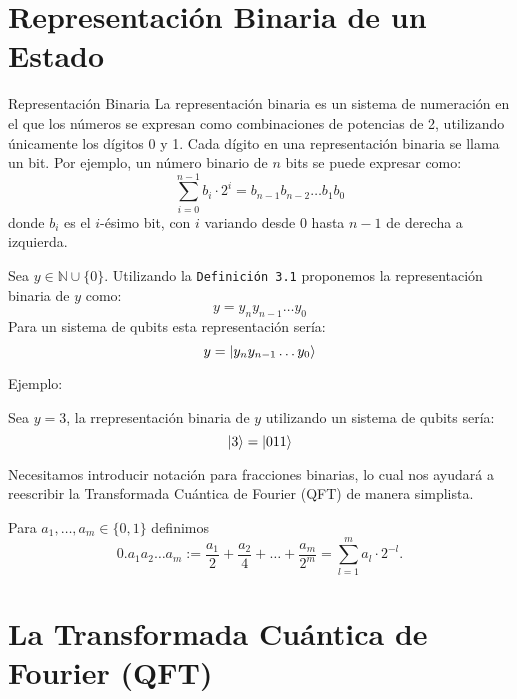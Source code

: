 \documentclass{article}
\begin{document}
\section{Representación Binaria de un Estado}
\begin{mydef}{Representación Binaria}{}
La representación binaria es un sistema de numeración en el que los números se expresan como combinaciones de potencias de 2, utilizando únicamente los dígitos 0 y 1. Cada dígito en una representación binaria se llama un bit. Por ejemplo, un número binario de \( n \) bits se puede expresar como:
\[
 \sum_{i=0}^{n-1} b_i \cdot 2^i = b_{n-1}b_{n-2}\ldots b_1b_0 
\]
donde \( b_i \) es el \( i \)-ésimo bit, con \( i \) variando desde 0 hasta \( n-1 \) de derecha a izquierda.
\end{mydef}
Sea \(y\in \mathbb{N}\cup\{0\}\). Utilizando la \texttt{Definición 3.1} proponemos la representación binaria
de \(y\) como: 
\[y= y_{n}y_{n-1}\ldots y_{0}\]
Para un sistema de qubits esta representación sería:
\[y= \ket{y_{n}y_{n-1}\ldots y_{0}}\]
\begin{mdframed}[linewidth=1pt, linecolor=orange]
    Ejemplo:

    Sea \(y= 3\), la rrepresentación binaria de \(y\) utilizando un sistema de qubits sería:
    \[\ket{3} = \ket{011}\]
\end{mdframed}

Necesitamos introducir notación para fracciones binarias,
lo cual nos ayudará a reescribir la Transformada Cuántica de Fourier (QFT)
de manera simplista.
\begin{mydef}{}{}
    Para $a_1, \ldots, a_m \in \{0, 1\}$ definimos
\[
0.a_1a_2 \ldots a_m := \frac{a_1}{2} + \frac{a_2}{4} + \ldots + \frac{a_m}{2^m} =
\sum_{l=1}^{m} a_l \cdot 2^{-l}.
\]
\end{mydef}
\section{La Transformada Cuántica de Fourier (QFT)}
\end{document}
